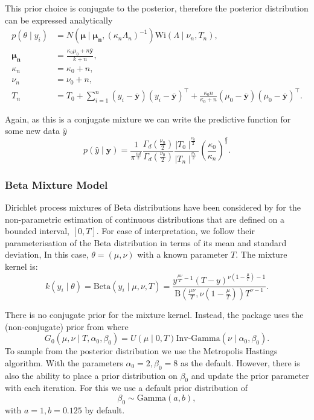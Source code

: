 \documentclass[nojss]{jss}
\begin{document}
This prior choice is conjugate to the posterior, therefore the posterior distribution can be expressed analytically
\begin{align*}
p(\theta \mid y_i ) & = N ( \boldsymbol{\mu} \mid \boldsymbol{\mu _n} , (\kappa _n \Lambda _n )^{-1}  ) \text{Wi} (\Lambda \mid \nu _n, T_n), \\
\boldsymbol{\mu _n} & = \frac{\kappa _0 \mu _0 + n \mathbf{\overline{{y}}}}{k + n}, \\
\kappa _n & = \kappa _0 + n, \\
\nu _n & = \nu _0 + n, \\
T_n & = T_0 + \sum _{i=1} ^n (y_i - \mathbf{\overline{{y}}}) ( y_i -  \mathbf{\overline{{y}}} ) ^\top + \frac{\kappa _0 n}{\kappa _0 + n} ( \mu _0 - \mathbf{\overline{{y}}} )( \mu _0 -  \mathbf{\overline{{y}}} ) ^\top.
\end{align*}

Again, as this is a conjugate mixture we can write the predictive function for some new data $\hat{y}$
\begin{equation}
p(\hat{y} \mid \mathbf{y}  ) = \frac{1}{\pi ^{\frac{nd}{2}}} \frac{\Gamma _d ( \frac{\nu _n}{2})}{\Gamma _d (\frac{\nu _0}{2})}  \frac{\mid T_0 \mid ^ \frac{\nu _0}{2}}{\mid T_n \mid ^ \frac{\nu _n}{2}} \left(  \frac{\kappa _0}{\kappa _n} \right)  ^\frac{d}{2}.
\end{equation}

\subsubsection{Beta Mixture Model}
Dirichlet process mixtures of Beta distributions have been considered by \cite{kottas_dirichlet_2006} for the non-parametric estimation of continuous distributions that are defined on a bounded interval, $\left[0, T \right]$. For ease of interpretation, we follow their parameterisation of the Beta distribution in terms of its mean and standard deviation, In this case, $\theta = (\mu,\nu)$ with a known parameter $T$. The mixture kernel is:
\begin{equation}
k(y_i \mid \theta) = \text{Beta} (y_i \mid \mu, \nu, T) = \frac{y^{\frac{\mu \nu}{T} - 1} (T-y)^{\nu (1- \frac{\mu}{T})-1}}{\text{B}(\frac{\mu \nu}{T}, \nu(1-\frac{\mu}{T})) T^{\nu -1}}.
\end{equation}

There is no conjugate prior for the mixture kernel. Instead, the  package uses the (non-conjugate) prior from \cite{kottas_dirichlet_2006} where
\begin{equation}
G_0 (\mu , \nu \mid T, \alpha _0 , \beta _0) = U(\mu \mid 0, T) \text{Inv-Gamma} (\nu \mid \alpha _0, \beta _0).
\end{equation}
To sample from the posterior distribution we use the Metropolis Hastings algorithm. With the parameters $\alpha _0 = 2, \beta _0 =8$ as the default. However, there is also the ability to place a prior distribution on $\beta _0$ and update the prior parameter with each iteration. For this we use a default prior distribution of
\begin{equation}
\beta _0 \sim \text{Gamma} (a, b),
\end{equation}
with $a=1, b=0.125$ by default.
\end{document}
